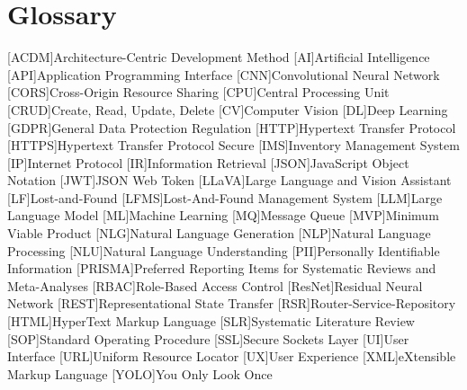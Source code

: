 \chapter{Glossary}

\footnotesize
\DoubleSpacing

\begin{multicols}{2}
\begin{acronym}[]
	[ACDM]{Architecture-Centric Development Method}
	[AI]{Artificial Intelligence}
	[API]{Application Programming Interface}
	[CNN]{Convolutional Neural Network}
	[CORS]{Cross-Origin Resource Sharing}
	[CPU]{Central Processing Unit}
	[CRUD]{Create, Read, Update, Delete}
	[CV]{Computer Vision}
	[DL]{Deep Learning}
	[GDPR]{General Data Protection Regulation}
	[HTTP]{Hypertext Transfer Protocol}
	[HTTPS]{Hypertext Transfer Protocol Secure}
	[IMS]{Inventory Management System}
	[IP]{Internet Protocol}
	[IR]{Information Retrieval}
	[JSON]{JavaScript Object Notation}
	[JWT]{JSON Web Token}
	[LLaVA]{Large Language and Vision Assistant}
	[LF]{Lost-and-Found}
	[LFMS]{Lost-And-Found Management System}
	[LLM]{Large Language Model}
	[ML]{Machine Learning}
	[MQ]{Message Queue}
	[MVP]{Minimum Viable Product}
	[NLG]{Natural Language Generation}
	[NLP]{Natural Language Processing}
	[NLU]{Natural Language Understanding}
	[PII]{Personally Identifiable Information}
	[PRISMA]{Preferred Reporting Items for Systematic Reviews and Meta-Analyses}
	[RBAC]{Role-Based Access Control}
	[ResNet]{Residual Neural Network}
	[REST]{Representational State Transfer}
	[RSR]{Router-Service-Repository}
	[HTML]{HyperText Markup Language}
	[SLR]{Systematic Literature Review}
	[SOP]{Standard Operating Procedure}
	[SSL]{Secure Sockets Layer}
	[UI]{User Interface}
	[URL]{Uniform Resource Locator}
	[UX]{User Experience}
	[XML]{eXtensible Markup Language}
	[YOLO]{You Only Look Once}
\end{acronym}
\end{multicols}

